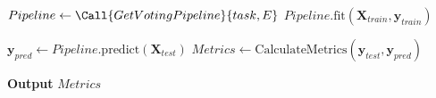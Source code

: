 \begin{listing}[H]
\begin{algorithmic}[1]
                \State {}
                \State $Pipeline \gets \Call{GetVotingPipeline}{task, E}$
                \State $Pipeline.\text{fit}(\mathbf{X}_{train}, \mathbf{y}_{train})$

                \State {}
                \State $\mathbf{y}_{pred} \gets Pipeline.\text{predict}(\mathbf{X}_{test})$
                \State $Metrics \gets \text{CalculateMetrics}(\mathbf{y}_{test}, \mathbf{y}_{pred})$
                
                \State \textbf{Output} $Metrics$
            \EndFor
        \EndProcedure
    \end{algorithmic}
        \caption{Alur kerja klasifikasi menggunakan ensemble Soft Voting.} 
    \label{lst:alg_classifierg}
\end{listing}